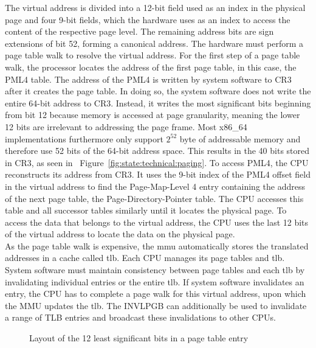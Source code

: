 The virtual address is divided into a 12-bit field used as an index in the
physical page and four 9-bit fields, which the hardware uses as an index to
access the content of the respective page level. The remaining address bits are
sign extensions of bit 52, forming a canonical address. The hardware must
perform a page table walk to resolve the virtual address. For the first step of
a page table walk, the processor locates the address of the first page table, in
this case, the PML4 table. The address of the PML4 is written by system software
to CR3 after it creates the page table. In doing so, the system software does
not write the entire 64-bit address to CR3. Instead, it writes the most
significant bits beginning from bit 12 because memory is accessed at page
granularity, meaning the lower 12 bits are irrelevant to addressing the page
frame. Most x86\_64 implementations furthermore only support $2^{52}$ byte of
addressable memory and therefore use 52 bits of the 64-bit address space. This
results in the 40 bits stored in CR3, as seen in
~Figure~\ref{fig:state:technical:paging}. To access PML4, the CPU reconstructs
its address from CR3. It uses the 9-bit index of the PML4 offset field in the
virtual address to find the Page-Map-Level 4 entry containing the address of the
next page table, the Page-Directory-Pointer table. The CPU accesses this table
and all successor tables similarly until it locates the physical page. To access
the data that belongs to the virtual address, the CPU uses the last 12 bits of
the virtual address to locate the data on the physical page. \\

As the page table walk is expensive, the \gls{mmu} automatically stores
the translated addresses in a cache called \gls{tlb}.
Each CPU manages its page tables and \gls{tlb}. System software must
maintain consistency between page tables and each \gls{tlb} by
invalidating individual entries or the entire \gls{tlb}. If system
software invalidates an entry, the CPU has to complete a page walk for this
virtual address, upon which the MMU updates the \gls{tlb}. The INVLPGB
can additionally be used to invalidate a range of TLB entries and broadcast
these invalidations to other CPUs. \\

\begin{figure}
    \begin{center}
        
        \caption{Layout of the 12 least significant bits in a page table entry}
        \label{fig:state:technical:paging_rights}
    \end{center}
\end{figure}

